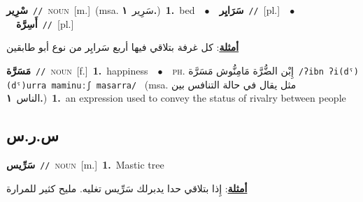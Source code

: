 \documentclass[10pt,a4paper,twoside]{article} %
\begin{document}
\begin{multicols}{2}
{\setlength\topsep{0pt}\textbf{\foreignlanguage{arabic}{سْرِير}}\ {\color{gray}\texttt{//}\color{black}}\ \textsc{noun}\ [m.]\ \color{gray}(msa. \foreignlanguage{arabic}{سَرِير}~\foreignlanguage{arabic}{\textbf{١.}})\color{black}\ \textbf{1.}~bed\ \ $\bullet$\ \ \setlength\topsep{0pt}\textbf{\foreignlanguage{arabic}{سَرَايِر}}\ {\color{gray}\texttt{//}\color{black}}\ [pl.]\ \ $\bullet$\ \ \setlength\topsep{0pt}\textbf{\foreignlanguage{arabic}{أَسِرَّة}}\ {\color{gray}\texttt{//}\color{black}}\ [pl.]\  \begin{flushright}\color{gray}\foreignlanguage{arabic}{\textbf{\underline{\foreignlanguage{arabic}{أمثلة}}}: كل غرفة بتلاقي فيها أربع سَرايِر من نوع أبو طابقين}\end{flushright}\color{black}} \vspace{2mm}

{\setlength\topsep{0pt}\textbf{\foreignlanguage{arabic}{مَسَرَّة}}\ {\color{gray}\texttt{//}\color{black}}\ \textsc{noun}\ [f.]\ \textbf{1.}~happiness\ \ $\bullet$\ \ \textsc{ph.} \color{gray} \foreignlanguage{arabic}{إِبْن الضُّرَّة مَامِنُّوش مَسَرَّة}\color{black}\ {\color{gray}\texttt{/{\sffamily ʔibn ʔi(dˤ)(dˤ)urra maminuːʃ masarra}/}\color{black}}\ \color{gray} (msa. \foreignlanguage{arabic}{مثل يقال في حالة التنافس بين الناس}~\foreignlanguage{arabic}{\textbf{١.}})\color{black}\ \textbf{1.}~an expression used to convey the status of rivalry between people\ } \vspace{2mm}

\vspace{-3mm}
\subsection*{\color{blue}\foreignlanguage{arabic}{س.ر.س}\color{blue}{ (ntws)}} 

{\setlength\topsep{0pt}\textbf{\foreignlanguage{arabic}{سَرِّيس}}\ {\color{gray}\texttt{//}\color{black}}\ \textsc{noun}\ [m.]\ \textbf{1.}~Mastic tree\  \begin{flushright}\color{gray}\foreignlanguage{arabic}{\textbf{\underline{\foreignlanguage{arabic}{أمثلة}}}: إِذا بتلاقي حدا يدبرلك سَرِّيس تغليه. مليح كثير للمرارة}\end{flushright}\color{black}} \vspace{2mm}


\end{multicols}
\end{document}
